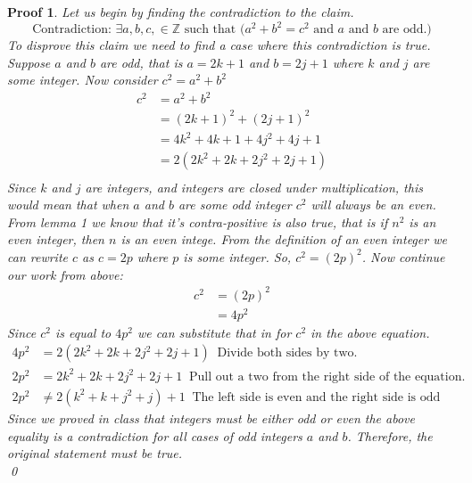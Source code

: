 \documentclass{article}
\newtheorem*{myproof}{Proof}
\begin{document}
\begin{myproof}
    Let us begin by finding the contradiction to the claim.
    $$ \text{Contradiction: }\exists a,b,c, \in \mathbb{Z} \text{ such that } (a^2+b^2=c^2 \text{ and } a \text{ and } b \text{ are odd.)}$$
    To disprove this claim we need to find a case where this contradiction is true. Suppose $a$ and $b$ are odd, that is $a = 2k+1$ and $b = 2j+1$ where $k$ and $j$ are some integer. Now consider $c^2 = a^2+b^2$
    \begin{align*}
        c^2 &= a^2+b^2 \\
        &= (2k+1)^2+(2j+1)^2 \\
        &= 4k^2+4k+1+4j^2+4j+1 \\
        &= 2(2k^2+2k+2j^2+2j+1) \\
    \end{align*}
    Since $k$ and $j$ are integers, and integers are closed under multiplication, this would mean that when $a$ and $b$ are some odd integer $c^2$ will always be an even. From lemma 1 we know that it's contra-positive is also true, that is if $n^2$ is an even integer, then $n$ is an even intege. From the definition of an even integer we can rewrite $c$ as $c = 2p$ where $p$ is some integer. So, $c^2 = (2p)^2$. Now continue our work from above:
    \begin{align*}
        c^2 &= (2p)^2 \\
        &= 4p^2
    \end{align*}
    Since $c^2$ is equal to $4p^2$ we can substitute that in for $c^2$ in the above equation.
    \begin{align*}
        4p^2&= 2(2k^2+2k+2j^2+2j+1) \;\;\text{Divide both sides by two.} \\
        2p^2 &= 2k^2+2k+2j^2+2j+1 \;\;\text{Pull out a two from the right side of the equation.}\\
        2p^2&\not= 2(k^2+k+j^2+j)+1 \;\;\text{The left side is even and the right side is odd}
    \end{align*}
    Since we proved in class that integers must be either odd or even the above equality is a contradiction for all cases of odd integers $a$ and $b$. Therefore, the original statement must be true.\\
    \qed
\end{myproof}
\newpage
\end{document}

